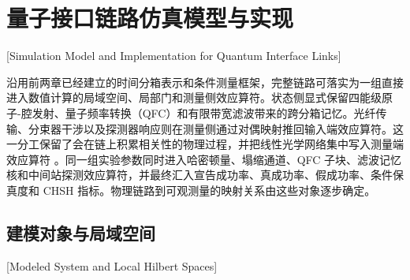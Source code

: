 ﻿

\chapter{量子接口链路仿真模型与实现}[Simulation Model and Implementation for Quantum Interface Links]

沿用前两章已经建立的时间分箱表示和条件测量框架，完整链路可落实为一组直接进入数值计算的局域空间、局部门和测量侧效应算符。状态侧显式保留四能级原子-腔发射、量子频率转换（QFC）和有限带宽滤波带来的跨分箱记忆。光纤传输、分束器干涉以及探测器响应则在测量侧通过对偶映射推回输入端效应算符。这一分工保留了会在链上积累相关性的物理过程，并把线性光学网络集中写入测量端效应算符 \cite{Pichler2016TimeDelaysMPS,Guimond2017DelayedCoherentFeedbackMPS}。同一组实验参数同时进入哈密顿量、塌缩通道、QFC 子块、滤波记忆核和中间站探测效应算符，并最终汇入宣告成功率、真成功率、假成功率、条件保真度和 CHSH 指标。物理链路到可观测量的映射关系由这些对象逐步确定。

\section{建模对象与局域空间}[Modeled System and Local Hilbert Spaces]

